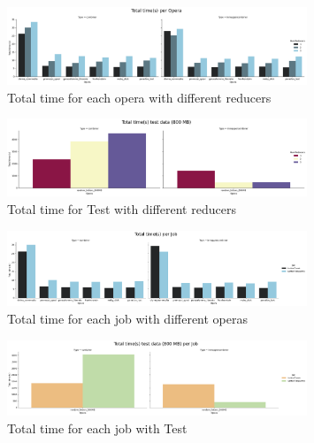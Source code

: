 \documentclass[a4paper, 12pt]{article}
\begin{document}
\begin{figure}[H]
  \centering
  \includegraphics[width=0.8\textwidth]{media/performance/total_time_S_per_opera.png}
  \caption{Total time for each opera with different reducers}
  \label{fig:TimeOperas}
\end{figure}

\begin{figure}[H]
  \centering
  \includegraphics[width=0.8\textwidth]{media/performance/total_time_S_per_opera(TEST).png}
  \caption{Total time for Test with different reducers}
  \label{fig:TimeTest}
\end{figure}

\begin{figure}[H]
  \centering
  \includegraphics[width=0.8\textwidth]{media/performance/total_time_S_per_job.png}
  \caption{Total time for each job with different operas}
  \label{fig:TimeJob}
\end{figure}

\begin{figure}[H]
  \centering
  \includegraphics[width=0.8\textwidth]{media/performance/total_time_S_per_job(TEST).png}
  \caption{Total time for each job with Test}
  \label{fig:TimeJobTest}
\end{figure}
\end{document}
